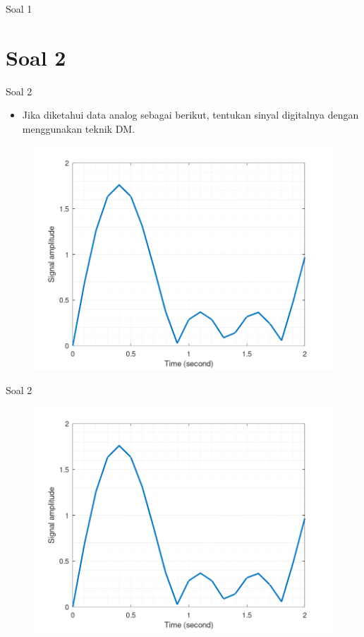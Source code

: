 \documentclass[aspectratio=169]{beamer}
\begin{document}
\begin{frame}[t]{Soal 1}

\end{frame}


\section{Soal 2}

\begin{frame}[t]{Soal 2}
	\begin{itemize}
		\item Jika diketahui data analog sebagai berikut, tentukan sinyal digitalnya dengan menggunakan teknik DM.
	\end{itemize}
	\begin{figure}
		\centering
		\includegraphics[width=0.5\linewidth]{../../../soal/kuis/soal2_kuis2}
	\end{figure}
\end{frame}

\begin{frame}[t]{Soal 2}
	\begin{figure}
		\centering
		\includegraphics[height=0.9\textheight]{../../../soal/kuis/soal2_kuis2}
	\end{figure}
\end{frame}
\end{document}
